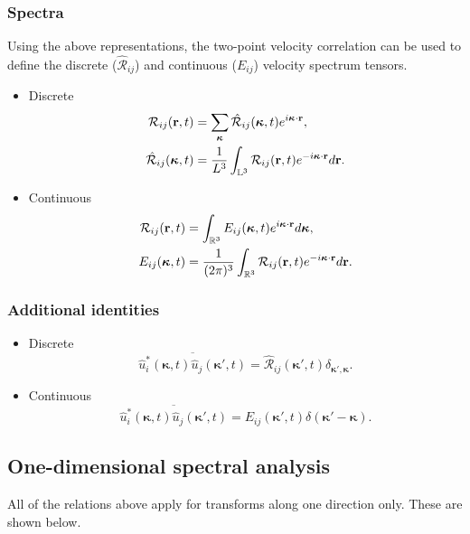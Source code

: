 \documentclass[oneside,a4paper,11pt]{report}
\newcommand{\tpvc}{\mathcal{R}} %
\newcommand{\est}{E}            %
\newcommand{\kappavec}{\boldsymbol{\kappa}}
\begin{document}
\subsubsection{Spectra}
Using the above representations, the two-point velocity correlation can be used to define the discrete ($\hat{\tpvc}_{ij}$) and continuous ($\est_{ij}$) velocity spectrum tensors.
\begin{itemize}
\item Discrete
\begin{align}
\label{eq:tpvc_discrete}
\tpvc_{ij}(\rvec,t) & = \sum_{\kappavec} \hat{\tpvc}_{ij}(\kappavec,t) e^{i \kappavec \cdot \rvec}, \\
\label{espec_discrete}
\hat{\tpvc}_{ij}(\kappavec,t) & = \frac{1}{L^3} \int_{\mathbb{L}^3} \tpvc_{ij}(\rvec,t) e^{-i \kappavec \cdot \rvec} d\rvec.
\end{align}
\item Continuous
\begin{align}
\label{eq:tpvc_continuous}
\tpvc_{ij}(\rvec,t) &= \int_\Rthree E_{ij}(\kappavec,t) e^{i \kappavec \cdot \rvec} d\kappavec, \\
\label{espec_continuous}
E_{ij}(\kappavec,t) & = \frac{1}{(2\pi)^3} \int_\Rthree \tpvc_{ij}(\rvec,t) e^{-i\kappavec \cdot \rvec} d\rvec.
\end{align}
\end{itemize}

\subsubsection{Additional identities}
\begin{itemize}
\item Discrete
\begin{equation} 
\label{fromu_toE_disc}
\overline{ \hat{u}_i^*(\kappavec,t) \hat{u}_j(\kappavec',t) } = \hat{\tpvc}_{ij}(\kappavec',t) \delta_{\kappavec',\kappavec}.
\end{equation}
\item Continuous
\begin{equation} 
\label{fromu_toE_cont}
\overline{ \hat{u}_i^*(\kappavec,t) \hat{u}_j(\kappavec',t) } = E_{ij}(\kappavec',t)\delta(\kappavec' - \kappavec).
\end{equation}
\end{itemize}

\subsection{One-dimensional spectral analysis}
All of the relations above apply for transforms along one direction only. These are shown below.
\end{document}
